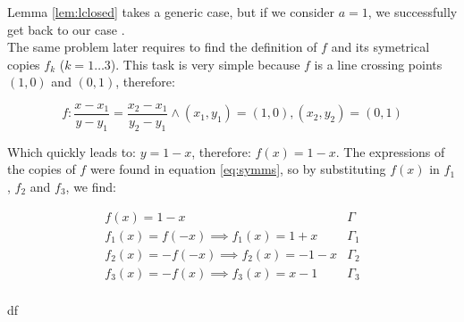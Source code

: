 \documentclass{layout}
\begin{document}
Lemma \ref{lem:lclosed} takes a generic case, but if we consider $a=1$, we
successfully get back to our case \cite{exam1}.\\

The same problem later requires to find the definition of $f$ and its symetrical
copies $f_k$ ($k = 1 \dots 3$). This task is very simple because $f$ is a line
crossing points $(1,0)$ and $(0,1)$, therefore:

\begin{equation*}
f: \frac{x-x_1}{y-y_1} = \frac{x_2-x_1}{y_2-y_1} \wedge (x_1,y_1) = (1,0), 
(x_2,y_2) = (0,1)
\end{equation*}

Which quickly leads to: $y = 1-x$, therefore: $f(x) = 1-x$. The expressions of the
copies of $f$ were found in equation \ref{eq:symms}, so by substituting $f(x)$
in $f_1$, $f_2$ and $f_3$, we find:

\begin{equation}\label{eq:exprs}
\begin{array}{l|c}
f(x) = 1 - x & \Gamma \\
f_1(x) = f(-x) \implies f_1(x) = 1 + x & \Gamma_1 \\
f_2(x) = -f(-x) \implies f_2(x) = - 1 - x & \Gamma_2 \\
f_3(x) = -f(x) \implies f_3(x) = x - 1 & \Gamma_3 \\
\end{array}
\end{equation}

df
\end{document}
